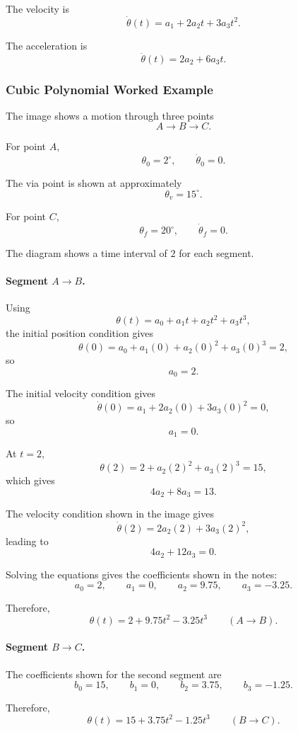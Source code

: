 \documentclass[11pt]{article}
\begin{document}
The velocity is
\[
\boxed{
\dot\theta(t)=a_1+2a_2t+3a_3t^2
}.
\]

The acceleration is
\[
\boxed{
\ddot\theta(t)=2a_2+6a_3t
}.
\]

\subsubsection{Cubic Polynomial Worked Example}

The image shows a motion through three points
\[
A\rightarrow B\rightarrow C.
\]

For point $A$,
\[
\theta_0=2^\circ,
\qquad
\dot\theta_0=0.
\]

The via point is shown at approximately
\[
\theta_v=15^\circ.
\]

For point $C$,
\[
\theta_f=20^\circ,
\qquad
\dot\theta_f=0.
\]

The diagram shows a time interval of $2$ for each segment.

\paragraph{Segment $A\rightarrow B$.}

Using
\[
\theta(t)=a_0+a_1t+a_2t^2+a_3t^3,
\]
the initial position condition gives
\[
\theta(0)
=
a_0+a_1(0)+a_2(0)^2+a_3(0)^3
=2,
\]
so
\[
a_0=2.
\]

The initial velocity condition gives
\[
\dot\theta(0)
=
a_1+2a_2(0)+3a_3(0)^2
=0,
\]
so
\[
a_1=0.
\]

At $t=2$,
\[
\theta(2)
=
2+a_2(2)^2+a_3(2)^3
=15,
\]
which gives
\[
4a_2+8a_3=13.
\]

The velocity condition shown in the image gives
\[
\dot\theta(2)
=
2a_2(2)+3a_3(2)^2,
\]
leading to
\[
4a_2+12a_3=0.
\]

Solving the equations gives the coefficients shown in the notes:
\[
a_0=2,
\qquad
a_1=0,
\qquad
a_2=9.75,
\qquad
a_3=-3.25.
\]

Therefore,
\[
\boxed{
\theta(t)=2+9.75t^2-3.25t^3
}
\qquad (A\rightarrow B).
\]

\paragraph{Segment $B\rightarrow C$.}

The coefficients shown for the second segment are
\[
b_0=15,
\qquad
b_1=0,
\qquad
b_2=3.75,
\qquad
b_3=-1.25.
\]

Therefore,
\[
\boxed{
\theta(t)=15+3.75t^2-1.25t^3
}
\qquad (B\rightarrow C).
\]
\end{document}
